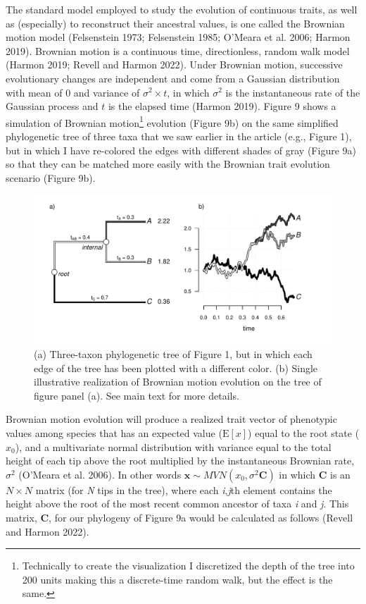 \documentclass{article}
\begin{document}
The standard model employed to study the evolution of continuous traits, as well as (especially) to reconstruct their ancestral values, is one called the Brownian motion model (Felsenstein 1973; Felsenstein 1985; O'Meara et al. 2006; Harmon 2019). Brownian motion is a continuous time, directionless, random walk model (Harmon 2019; Revell and Harmon 2022). Under Brownian motion, successive evolutionary changes are independent and come from a Gaussian distribution with mean of 0 and variance of \(\sigma^2 \times t\), in which \(\sigma^2\) is the instantaneous rate of the Gaussian process and \(t\) is the elapsed time (Harmon 2019). Figure 9 shows a simulation of Brownian motion\footnote{Technically to create the visualization I discretized the depth of the tree into 200 units making this a discrete-time random walk, but the effect is the same.} evolution (Figure 9b) on the same simplified phylogenetic tree of three taxa that we saw earlier in the article (e.g., Figure 1), but in which I have re-colored the edges with different shades of gray (Figure 9a) so that they can be matched more easily with the Brownian trait evolution scenario (Figure 9b).

\begin{figure}
\includegraphics[width=1\linewidth]{Revell.AncestralReconstruction_files/figure-latex/fig9-1} \caption{(a) Three-taxon phylogenetic tree of Figure 1, but in which each edge of the tree has been plotted with a different color. (b) Single illustrative realization of Brownian motion evolution on the tree of figure panel (a). See main text for more details.}\label{fig:fig9}
\end{figure}

Brownian motion evolution will produce a realized trait vector of phenotypic values among species that has an expected value (\(\text{E}[x]\)) equal to the root state (\(x_0\)), and a multivariate normal distribution with variance equal to the total height of each tip above the root multiplied by the instantaneous Brownian rate, \(\sigma^2\) (O'Meara et al. 2006). In other words \(\mathbf{x} \sim \mathit{MVN}(x_0,\sigma^2\mathbf{C})\) in which \textbf{C} is an \(N \times N\) matrix (for \emph{N} tips in the tree), where each \emph{i},\emph{j}th element contains the height above the root of the most recent common ancestor of taxa \emph{i} and \emph{j}. This matrix, \textbf{C}, for our phylogeny of Figure 9a would be calculated as follows (Revell and Harmon 2022).
\end{document}
